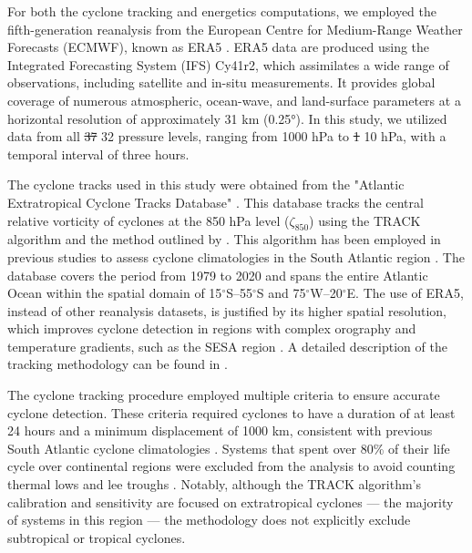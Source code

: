 \documentclass[pdflatex,sn-chicago]{sn-jnl}%
\makeatletter
\theoremstyle{plain}
\theoremstyle{definition}
\theoremstyle{remark}
\theoremstyle{definition}
\providecommand{\DIFaddtex}[1]{{\protect\color{blue}#1}} %
\providecommand{\DIFdeltex}[1]{{\protect\color{red}\sout{#1}}} %
\providecommand{\DIFaddbegin}{} %
\providecommand{\DIFaddend}{} %
\providecommand{\DIFdelbegin}{} %
\providecommand{\DIFdelend}{} %
\providecommand{\DIFadd}[1]{\texorpdfstring{\DIFaddtex{#1}}{#1}} %
\providecommand{\DIFdel}[1]{\texorpdfstring{\DIFdeltex{#1}}{}} %
\let\sout@orig\sout %
\renewcommand{\sout}[1]{\ifmmode\text{\sout@orig{\ensuremath{#1}}}\else\sout@orig{#1}\fi} %
\makeatother
\begin{document}
For both the cyclone tracking and energetics computations, we employed the fifth-generation reanalysis from the European Centre for Medium-Range Weather Forecasts (ECMWF), known as ERA5 \citep{hersbach2020era5}. ERA5 data are produced using the Integrated Forecasting System (IFS) Cy41r2, which assimilates a wide range of observations, including satellite and in-situ measurements. It provides global coverage of numerous atmospheric, ocean-wave, and land-surface parameters at a horizontal resolution of approximately 31 km (0.25°). In this study, we utilized data from all \DIFdelbegin \DIFdel{37 }\DIFdelend \DIFaddbegin \DIFadd{32 }\DIFaddend pressure levels, ranging from 1000 hPa to \DIFdelbegin \DIFdel{1 }\DIFdelend \DIFaddbegin \DIFadd{10 }\DIFaddend hPa, with a temporal interval of three hours.

The cyclone tracks used in this study were obtained from the "Atlantic Extratropical Cyclone Tracks Database" \citep{gramcianinov2020data}. This database tracks the central relative vorticity of cyclones at the 850 hPa level (\(\zeta_{850}\)) using the TRACK algorithm \citep{hodges1994general, hodges1995feature} and the method outlined by \citet{hoskins2002new}. This algorithm has been employed in previous studies to assess cyclone climatologies in the South Atlantic region \citep{gramcianinov2019properties,gramcianinov2020analysis,couto2024new}. The database covers the period from 1979 to 2020 and spans the entire Atlantic Ocean within the spatial domain of 15\(^\circ\)S–55\(^\circ\)S and 75\(^\circ\)W–20\(^\circ\)E. The use of ERA5, instead of other reanalysis datasets, is justified by its higher spatial resolution, which improves cyclone detection in regions with complex orography and temperature gradients, such as the SESA region \citep{gramcianinov2020analysis}. A detailed description of the tracking methodology can be found in \citet{gramcianinov2020analysis}.

The cyclone tracking procedure employed multiple criteria to ensure accurate cyclone detection. These criteria required cyclones to have a duration of at least 24 hours and a minimum displacement of 1000 km, consistent with previous South Atlantic cyclone climatologies \citep{sinclair1995climatology,gramcianinov2019properties}. Systems that spent over 80\% of their life cycle over continental regions were excluded from the analysis to avoid counting thermal lows and lee troughs \citep[e.g.][]{crespo2021potential}. Notably, although the TRACK algorithm's calibration and sensitivity are focused on extratropical cyclones — the majority of systems in this region \citep{marrafon2022classificaccao} — the methodology does not explicitly exclude subtropical or tropical cyclones.  
\end{document}
